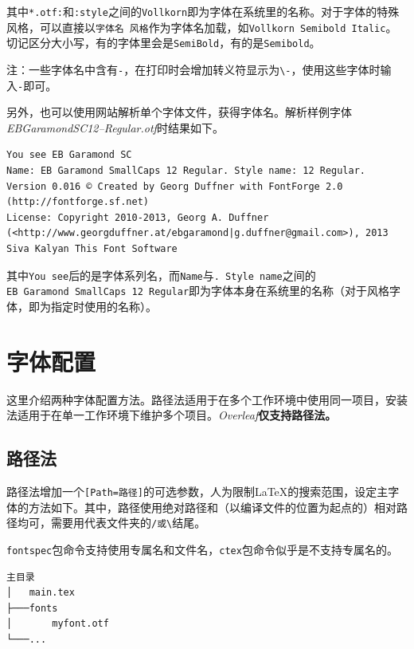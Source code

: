 \documentclass[10pt,openany]{book}
\begin{document}
其中\texttt{*.otf:}和\texttt{:style}之间的\texttt{Vollkorn}即为字体在系统里的名称。对于字体的特殊风格，可以直接以\texttt{字体名\ 风格}作为字体名加载，如\texttt{Vollkorn\ Semibold\ Italic}。切记区分大小写，有的字体里会是\texttt{SemiBold}，有的是\texttt{Semibold}。

注：一些字体名中含有\texttt{-}，在打印时会增加转义符显示为\texttt{\textbackslash{}-}，使用这些字体时输入\texttt{-}即可。

另外，也可以使用网站解析单个字体文件，获得字体名。解析样例字体\textit{EBGaramondSC12--Regular.otf}时结果如下。

\begin{lstlisting}[title=FontDrop!解析结果]
You see EB Garamond SC
Name: EB Garamond SmallCaps 12 Regular. Style name: 12 Regular. Version 0.016 © Created by Georg Duffner with FontForge 2.0 (http://fontforge.sf.net)
License: Copyright 2010-2013, Georg A. Duffner (<http://www.georgduffner.at/ebgaramond|g.duffner@gmail.com>), 2013 Siva Kalyan This Font Software  
\end{lstlisting}

其中\texttt{You\ see}后的是字体系列名，而\texttt{Name}与\texttt{.\ Style\ name}之间的\texttt{EB\ Garamond\ SmallCaps\ 12\ Regular}即为字体本身在系统里的名称（对于风格字体，即为指定时使用的名称）。

\section{字体配置}

这里介绍两种字体配置方法。路径法适用于在多个工作环境中使用同一项目，安装法适用于在单一工作环境下维护多个项目。\textit{Overleaf}\textbf{仅支持路径法。}

\subsection{路径法}

路径法增加一个\texttt{[Path=路径]}的可选参数，人为限制{\LaTeX}的搜索范围，设定主字体的方法如下。其中，路径使用绝对路径和（以编译文件的位置为起点的）相对路径均可，需要用代表文件夹的\texttt{/或\textbackslash{}}结尾。

\texttt{fontspec}包命令支持使用专属名和文件名，\texttt{ctex}包命令似乎是不支持专属名的。

\begin{lstlisting}[title=文件结构示例]
主目录
│   main.tex
├───fonts
│       myfont.otf
└───...
\end{lstlisting}
\end{document}
